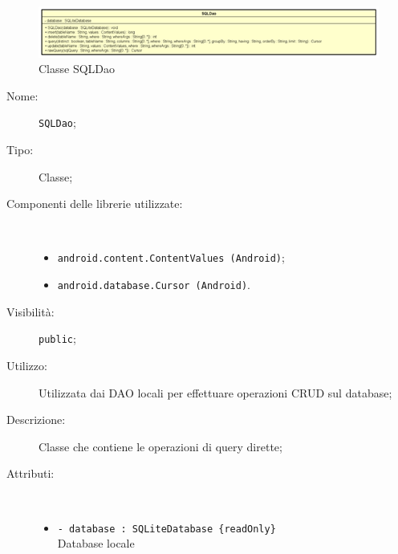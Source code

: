 \documentclass[../DefinizioneDiProdotto.tex]{subfiles}
\begin{document}
    \begin{figure}[H]
        \centering
        \includegraphics{img/SQLDao.png}
        \caption{Classe SQLDao}\label{fig:model::dataaccess::dao::SQLDao} 
    \end{figure}
    \begin{description}
\item[Nome:] \texttt{SQLDao};
\item[Tipo:] Classe;
\item[Componenti delle librerie utilizzate:] \
\begin{itemize}
\item \texttt{android.content.ContentValues (Android)};

\item \texttt{android.database.Cursor (Android)}.

\end{itemize}
\item[Visibilità:] \texttt{public};
\item[Utilizzo:] Utilizzata dai DAO locali per effettuare operazioni CRUD sul database;
\item[Descrizione:] Classe che contiene le operazioni di query dirette;
\item[Attributi:] \
\begin{itemize}
\item \texttt{- database : SQLiteDatabase \{readOnly\}}\\
Database locale


\end{itemize}
\end{description}
\end{document}
